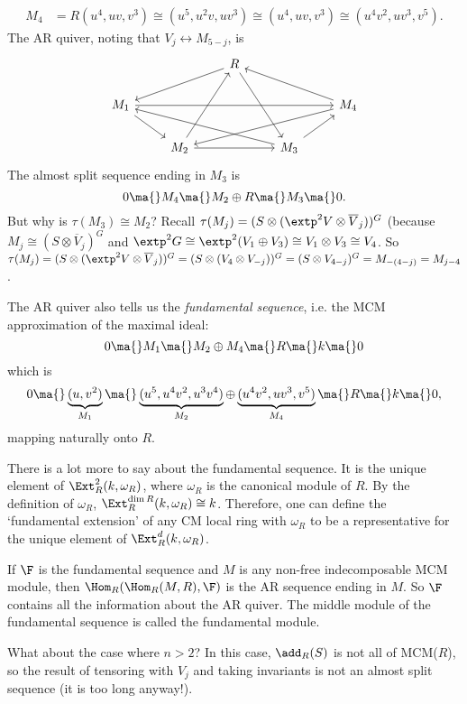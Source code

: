 \begin{ex}
\[\begin{split}
	M_4&= R(u^4,uv,v^3) \cong (u^5,u^2v,uv^3) \cong (u^4,uv,v^3) \cong (u^4v^2,uv^3,v^5).
	\end{split}
	\]
The AR quiver, noting that $V_j \leftrightarrow M_{5-j}$, is
	\[
	\begin{tikzcd}
	& & R \arrow{dll} \arrow{ddr} & & \\
	M_1 \arrow{dr} \arrow{rrrr} & & & & M_4 \arrow{dlll} \arrow{ull} \\
	& M_2 \arrow{rr} \arrow{uur} & & M_3 \arrow{ur} \arrow{ulll} & 
	\end{tikzcd}
	\]
The almost split sequence ending in $M_3$ is
	\[
	0 \ma{} M_4 \ma{} M_2 \oplus R \ma{} M_3 \ma{} 0.
	\]
But why is $\tau(M_3) \cong M_2$? Recall $\tau(M_j)= (S \otimes (\extp^2 V \otimes \overline{V}_j))^G$ (because $M_j \cong (S \otimes \overline{V}_j)^G$ and $\extp^2G \cong \extp^2(V_1 \oplus V_3) \cong V_1 \otimes V_3 \cong V_4$. So $\tau(M_j)= (S \otimes (\extp^2 V \otimes \overline{V}_j))^G= (S \otimes (V_4 \otimes V_{-j}))^G= (S \otimes V_{4-j})^G= M_{-(4-j)}= M_{j-4}$.

The AR quiver also tells us the \emph{fundamental sequence}, i.e. the MCM approximation of the maximal ideal: 
	\[
	0 \ma{} M_1 \ma{} M_2 \oplus M_4 \ma{} R \ma{} k \ma{} 0
	\]
which is
	\[
	0 \ma{} \underbrace{(u,v^2)}_{M_1} \ma{} \underbrace{(u^5,u^4v^2,u^3v^4)}_{M_2} \oplus \underbrace{(u^4v^2, uv^3,v^5)}_{M_4} \ma{} R \ma{} k \ma{} 0,
	\]
mapping naturally onto $R$. 
\end{ex}




There is a lot more to say about the fundamental sequence. It is the unique element of $\Ext_R^2(k,\omega_R)$, where $\omega_R$ is the canonical module of $R$. By the definition of $\omega_R$, $\Ext_R^{\dim R}(k,\omega_R) \cong k$. Therefore, one can define the `fundamental extension' of any CM local ring with $\omega_R$ to be a representative for the unique element of $\Ext_R^d(k,\omega_R)$. 




If $\F$ is the fundamental sequence and $M$ is any non-free indecomposable MCM module, then $\Hom_R(\Hom_R(M,R),\F)$ is the AR sequence ending in $M$. So $\F$ contains all the information about the AR quiver. The middle module of the fundamental sequence is called the fundamental module. 





What about the case where $n>2$? In this case, $\add_R(S)$ is not all of MCM($R$), so the result of tensoring with $V_j$ and taking invariants is not an almost split sequence (it is too long anyway!). 

